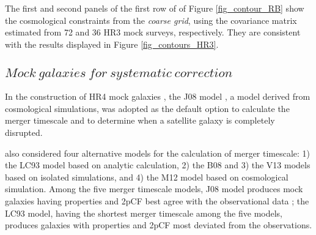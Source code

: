 \documentclass[iop]{emulateapj}
\begin{document}
The first and second panels of the first row of of Figure \ref{fig_contour_RB} show  %
the cosmological constraints from the {\it coarse grid}, 
using the covariance matrix estimated from 72 and 36 HR3 mock surveys, respectively.
They are consistent with the results displayed in Figure \ref{fig_contours_HR3}.







\subsection{$Mock\ galaxies\ for\ systematic\ correction$}

In the construction of HR4 mock galaxies \citep{hong2016}, 
the J08 model \citep{jiang2008}, a model derived from cosmological simulations, 
was adopted as the default option to calculate the merger timescale and to determine when a satellite galaxy is completely disrupted.

\cite{hong2016} also considered four alternative models for the calculation of merger timescale:
1) the LC93 model \citep{LC93} based on analytic calculation, 
2) the B08 \citep{B08} and 3) the V13 \citep{V13} models based on isolated simulations,
and 4) the M12 model \citep{M12} based on cosmological simulation.
Among the five merger timescale models, 
J08 model produces mock galaxies having properties and 2pCF best agree with the observational data \citep{hong2016};
the LC93 model, having the shortest merger timescale among the five models,
produces galaxies with properties and 2pCF most deviated from the observations.
\end{document}
